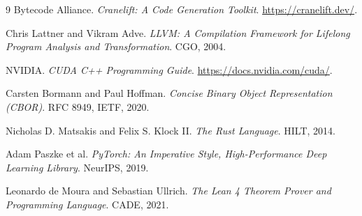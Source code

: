 \documentclass[11pt]{article}
\begin{document}
\begin{thebibliography}{9}
Bytecode Alliance. \emph{Cranelift: A Code Generation Toolkit}.
\url{https://cranelift.dev/}.

Chris Lattner and Vikram Adve.
\emph{LLVM: A Compilation Framework for Lifelong Program Analysis and
Transformation}. CGO, 2004.

NVIDIA. \emph{CUDA C++ Programming Guide}.
\url{https://docs.nvidia.com/cuda/}.

Carsten Bormann and Paul Hoffman. \emph{Concise Binary Object Representation
(CBOR)}. RFC 8949, IETF, 2020.

Nicholas D. Matsakis and Felix S. Klock II. \emph{The Rust Language}.
HILT, 2014.

Adam Paszke et al. \emph{PyTorch: An Imperative Style, High-Performance Deep
Learning Library}. NeurIPS, 2019.

Leonardo de Moura and Sebastian Ullrich.
\emph{The Lean 4 Theorem Prover and Programming Language}.
CADE, 2021.
\end{thebibliography}
\end{document}
